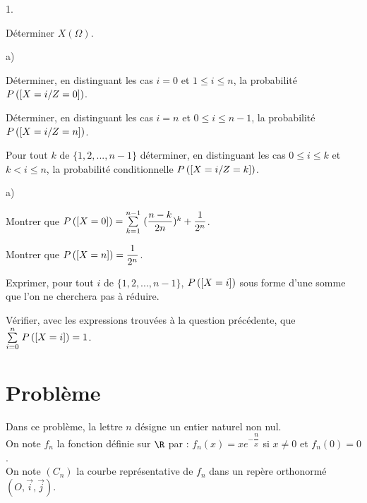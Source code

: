 \documentclass[11pt]{article}%
\begin{document}
\begin{noliste}{1.}
\item Déterminer $X(\Omega )$.

\item 

\begin{noliste}{a)}
 \setlength{\itemsep}{2mm}
\item Déterminer, en distinguant les cas $i = 0$ et $1\leq i\leq n$,
la probabilité $P\left(\left[ {X = i/Z = 0} \right]\right)$.

\item Déterminer, en distinguant les cas $i = n$ et $0\leq i\leq n-1$,
la probabilité $P\left(\left[ {X = i/Z = n} \right]\right)$.

\item Pour tout $k$ de $\{1,2,...,n-1\}$ déterminer, en distinguant les
cas $
0\leq i\leq k$ et $k<i\leq n$, la probabilité conditionnelle $
P\left(\left[ {X = i/Z = k} \right]\right)$.
\end{noliste}

\item 

\begin{noliste}{a)}
 \setlength{\itemsep}{2mm}
\item Montrer que $P\left(\left[ {X = 0} \right]\right) = {\textstyle\sum\limits_{k =
1}^{n-1}}\hspace{.1cm}(\dfrac{n-k}{2n})^{k} + 
\dfrac{1}{2^{n}}$.

\item Montrer que $P\left(\left[ {X = n} \right]\right) = \dfrac{1}{2^{n}}$.

\item Exprimer, pour tout $i$ de $\{1,2,...,n-1\}$, $P\left(\left[ {X =
i} \right]\right)$ sous forme
d'une somme que l'on ne cherchera pas à réduire.
\end{noliste}

\item Vérifier, avec les expressions trouvées à la question précédente,
que ${\textstyle\sum\limits_{i = 0}^{n}}\hspace{.1cm}P\left(\left[ {X = i} \right]\right) = 1$.
\end{noliste}

\newpage

\section*{Problème}

Dans ce problème, la lettre $n$ désigne un entier naturel non nul.\\
On note $f_{n}$ la fonction définie sur $\R$ par : $f_{n}(x) =
xe^{-\dfrac{n}{x}}$ si $x\neq 0$ et $f_{n}(0) = 0$.\\
On note $(C_{n})$ la courbe représentative de $f_{n}$ dans un repère
orthonormé $(O,\vec{i},\vec{j})$.
\end{document}
